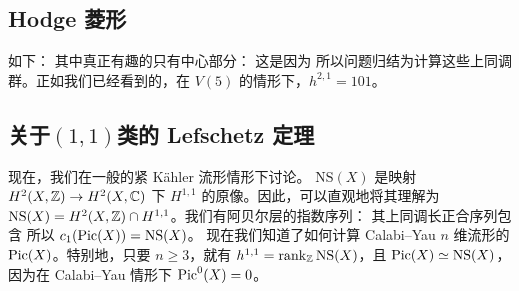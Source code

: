 \subsection{Hodge 菱形}
如下：
其中真正有趣的只有中心部分：
这是因为
所以问题归结为计算这些上同调群。正如我们已经看到的，在 $V(5)$ 的情形下，$h^{2,1}=101$。
\subsection{关于\texorpdfstring{$(1,1)$}{(1,1)}类的 Lefschetz 定理}
现在，我们在一般的紧 Kähler 流形情形下讨论。 $\mathrm{NS}(X)$ 是映射 $H^2(X,\mathbb Z)\to H^2(X,\mathbb C)$ 下 $H^{1,1}$ 的原像。因此，可以直观地将其理解为 $\mathrm{NS}(X)=H^2(X,\mathbb Z)\cap H^{1,1}$。我们有阿贝尔层的指数序列：
其上同调长正合序列包含
所以 $c_1(\operatorname{Pic}(X))=\mathrm{NS}(X)$。
现在我们知道了如何计算 Calabi–Yau $n$ 维流形的 $\operatorname{Pic}(X)$。特别地，只要 $n\ge3$，就有 $h^{1,1}=\operatorname{rank}_{\mathbb Z}\mathrm{NS}(X)$，且 $\operatorname{Pic}(X)\simeq\mathrm{NS}(X)$，因为在 Calabi–Yau 情形下 $\operatorname{Pic}^0(X)=0$。
